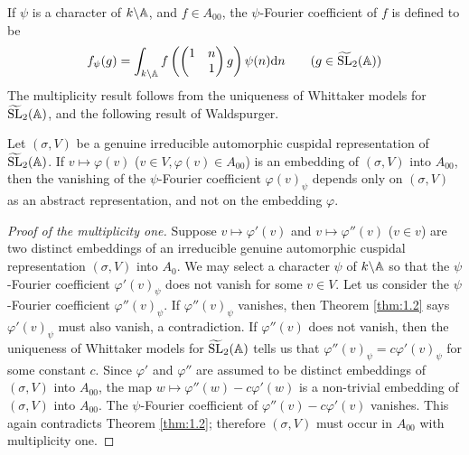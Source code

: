 If $\psi$ is a character of $k \backslash \mathbb{A}$, and $f \in A_{00}$, the $\psi$-Fourier coefficient of $f$ is defined to be
\[
f_\psi(g) = \int_{k \backslash \mathbb{A}} f\left(\begin{pmatrix} 1 & n \\ & 1\end{pmatrix}g\right) \psi(n) \mathrm{d} n \qquad (g \in \widetilde{\mathrm{SL}}_2(\mathbb{A}))
\]
The multiplicity result follows from the uniqueness of Whittaker models for $\widetilde{\mathrm{SL}}_2(\mathbb{A})$, and the following result of Waldspurger.

\begin{theorem}
\label{thm:1.2}
Let $(\sigma, V)$ be a genuine irreducible automorphic cuspidal representation of $\widetilde{\mathrm{SL}}_2(\mathbb{A})$.
If $v \mapsto \varphi(v)$ ($v \in V, \varphi(v) \in A_{00}$)
is an embedding of $(\sigma, V)$ into $A_{00}$, then the vanishing of the $\psi$-Fourier coefficient $\varphi(v)_\psi$ depends only on $(\sigma, V)$ as an abstract representation, and not on the embedding $\varphi$.
\end{theorem}


\begin{proof}[Proof of the multiplicity one]
Suppose $v \mapsto \varphi'(v)$ and $v \mapsto \varphi''(v)$
($v \in v$) are two distinct embeddings of an irreducible genuine automorphic cuspidal representation $(\sigma, V)$ into $A_0$.
We may select a character $\psi$ of $k \backslash \mathbb{A}$ so that the $\psi$-Fourier coefficient $\varphi'(v)_\psi$ does
not vanish for some $v \in V$.
Let us consider the $\psi$-Fourier coefficient
$\varphi''(v)_\psi$.
If $\varphi''(v)_\psi$ vanishes, then Theorem \ref{thm:1.2} says $\varphi'(v)_\psi$ must also vanish, a contradiction.
If $\varphi''(v)$ does not vanish, then the uniqueness of Whittaker models for $\widetilde{\mathrm{SL}}_2(\mathbb{A})$ tells us that $\varphi''(v)_\psi = c\varphi'(v)_\psi$ for some constant $c$.
Since $\varphi'$ and $\varphi''$ are assumed to be distinct
embeddings of $(\sigma, V)$ into $A_{00}$, the map $w \mapsto \varphi''(w) - c\varphi'(w)$ is a non-trivial embedding of 
 $(\sigma, V)$ into $A_{00}$.
The $\psi$-Fourier coefficient of $\varphi''(v) - c\varphi'(v)$ vanishes.
This again contradicts Theorem \ref{thm:1.2}; therefore $(\sigma, V)$ must occur in $A_{00}$ with multiplicity one.
\end{proof}

